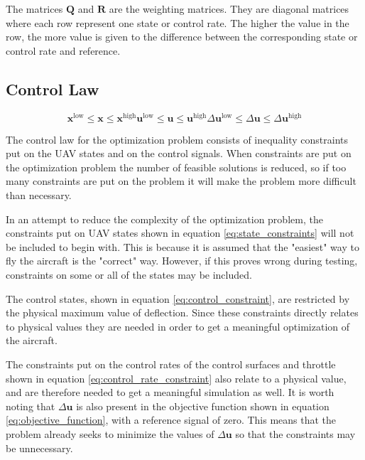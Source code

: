 The matrices $\mathbf{Q}$ and $\mathbf{R}$ are the weighting matrices. They are diagonal matrices where each row represent one state or control rate. The higher the value in the row, the more value is given to the difference between the corresponding state or control rate and reference.

\subsection{Control Law}

\begin{subequations}
\begin{equation}
	\label{eq:state_constraints}
	\mathbf{x}^{\text{low}} \leq \mathbf{x} \leq \mathbf{x}^{\text{high}}
\end{equation}
\begin{equation}
	\label{eq:control_constraint}
	\mathbf{u}^{\text{low}} \leq \mathbf{u} \leq \mathbf{u}^{\text{high}}
\end{equation}
\begin{equation}
	\label{eq:control_rate_constraint}
	\Delta\mathbf{u}^{\text{low}} \leq \Delta\mathbf{u} \leq \Delta\mathbf{u}^{\text{high}}
\end{equation}
\end{subequations}

The control law for the optimization problem consists of inequality constraints put on the UAV states and on the control signals. When constraints are put on the optimization problem the number of feasible solutions is reduced, so if too many constraints are put on the problem it will make the problem more difficult than necessary.

In an attempt to reduce the complexity of the optimization problem, the constraints put on UAV states shown in equation \ref{eq:state_constraints} will not be included to begin with. This is because it is assumed that the "easiest" way to fly the aircraft is the "correct" way. However, if this proves wrong during testing, constraints on some or all of the states may be included.

The control states, shown in equation \ref{eq:control_constraint}, are restricted by the physical maximum value of deflection. Since these constraints directly relates to physical values they are needed in order to get a meaningful optimization of the aircraft.

The constraints put on the control rates of the control surfaces and throttle shown in equation \ref{eq:control_rate_constraint} also relate to a physical value, and are therefore needed to get a meaningful simulation as well. It is worth noting that $\Delta\mathbf{u}$ is also present in the objective function shown in equation \ref{eq:objective_function}, with a reference signal of zero. This means that the problem already seeks to minimize the values of $\Delta\mathbf{u}$ so that the constraints may be unnecessary.
